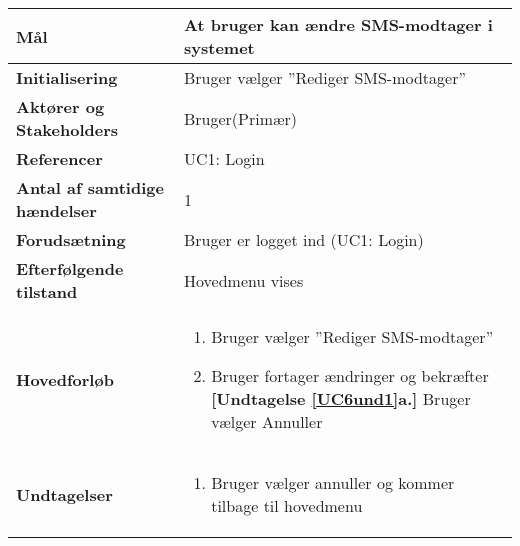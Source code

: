 \begin{table}[H] \centering
\begin{tabular}{|p{6cm}|p{8cm}|}
	\hline
\textbf{Mål} &
At bruger kan ændre SMS-modtager i systemet\\\hline

\textbf{Initialisering} &
Bruger vælger ''Rediger SMS-modtager'' \\\hline
 
\textbf{Aktører og Stakeholders} &
Bruger(Primær) \\\hline

\textbf{Referencer} &
UC1: Login  \\\hline

\textbf{Antal af samtidige hændelser} &
1  \\\hline

\textbf{Forudsætning} &
Bruger er logget ind (UC1: Login)\\\hline

\textbf{Efterfølgende tilstand} &
Hovedmenu vises  \\\hline

\textbf{Hovedforløb} &
\begin{enumerate}

\item Bruger vælger ''Rediger SMS-modtager''
\item \label{UC6und1}Bruger fortager ændringer og bekræfter \newline
\textbf{[Undtagelse \ref{UC6und1}a.]} Bruger vælger Annuller

\end{enumerate}   
 \\\hline
 
\textbf{Undtagelser}
&\begin{enumerate}[label= \ref{UC6und1}a.]
\item Bruger vælger annuller og kommer tilbage til hovedmenu
\end{enumerate}
 \\\hline
 

	\end{tabular}
	\label{UC6} 
\end{table}